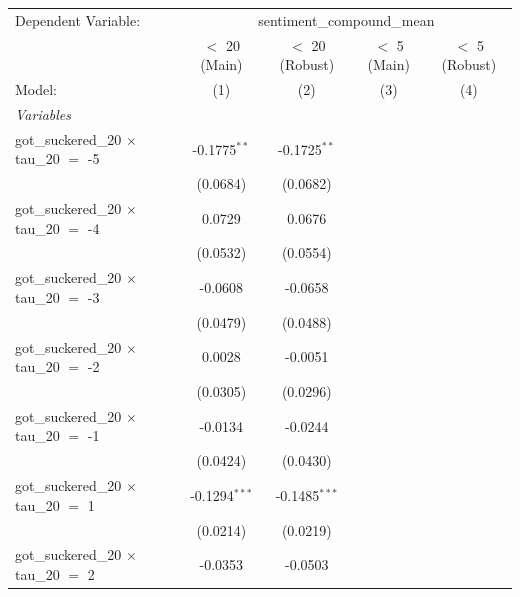 
\begingroup
\centering
\begin{tabular}{lcccc}
   \tabularnewline \midrule \midrule
   Dependent Variable: & \multicolumn{4}{c}{sentiment\_compound\_mean}\\
                                                 & $<$ 20 (Main)         & $<$ 20 (Robust) & $<$ 5 (Main)    & $<$ 5 (Robust) \\   
   Model:                                        & (1)                   & (2)             & (3)             & (4)\\  
   \midrule
   \emph{Variables}\\
   got\_suckered\_20 $\times$ tau\_20 $=$ -5     & -0.1775$^{**}$        & -0.1725$^{**}$  &                 &   \\   
                                                 & (0.0684)              & (0.0682)        &                 &   \\   
   got\_suckered\_20 $\times$ tau\_20 $=$ -4     & 0.0729                & 0.0676          &                 &   \\   
                                                 & (0.0532)              & (0.0554)        &                 &   \\   
   got\_suckered\_20 $\times$ tau\_20 $=$ -3     & -0.0608               & -0.0658         &                 &   \\   
                                                 & (0.0479)              & (0.0488)        &                 &   \\   
   got\_suckered\_20 $\times$ tau\_20 $=$ -2     & 0.0028                & -0.0051         &                 &   \\   
                                                 & (0.0305)              & (0.0296)        &                 &   \\   
   got\_suckered\_20 $\times$ tau\_20 $=$ -1     & -0.0134               & -0.0244         &                 &   \\   
                                                 & (0.0424)              & (0.0430)        &                 &   \\   
   got\_suckered\_20 $\times$ tau\_20 $=$ 1      & -0.1294$^{***}$       & -0.1485$^{***}$ &                 &   \\   
                                                 & (0.0214)              & (0.0219)        &                 &   \\   
   got\_suckered\_20 $\times$ tau\_20 $=$ 2      & -0.0353               & -0.0503         &                 &   \\   

\end{tabular}
